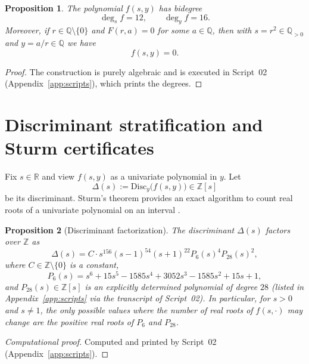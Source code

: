 \documentclass[12pt]{article}
\newtheorem{proposition}{Proposition}
\theoremstyle{remark}
\theoremstyle{definition}
\begin{document}
\begin{proposition}\label{prop:f}
The polynomial $f(s,y)$ has bidegree
\[
\deg_s f=12,\qquad \deg_y f=16.
\]
Moreover, if $r\in\mathbb{Q}\setminus\{0\}$ and $F(r,a)=0$ for some $a\in\mathbb{Q}$, then with $s=r^2\in\mathbb{Q}_{>0}$ and $y=a/r\in\mathbb{Q}$ we have
\[
f(s,y)=0.
\]
\end{proposition}

\begin{proof}
The construction is purely algebraic and is executed in Script~02 (Appendix~\ref{app:scripts}), which prints the degrees.
\end{proof}


\section{Discriminant stratification and Sturm certificates}\label{sec:sturm}

Fix $s\in\mathbb{R}$ and view $f(s,y)$ as a univariate polynomial in $y$.
Let
\[
\Delta(s):=\mathrm{Disc}_y\bigl(f(s,y)\bigr)\in\mathbb{Z}[s]
\]
be its discriminant.
Sturm's theorem provides an exact algorithm to count real roots of a univariate polynomial on an interval \cite{Sturm}.

\begin{proposition}[Discriminant factorization]\label{prop:disc}
The discriminant $\Delta(s)$ factors over $\mathbb{Z}$ as
\begin{equation}\label{eq:disc}
\Delta(s)=C\cdot s^{156}(s-1)^{54}(s+1)^{22}P_6(s)^{4}P_{28}(s)^{2},
\end{equation}
where $C\in\mathbb{Z}\setminus\{0\}$ is a constant,
\begin{equation}\label{eq:P6}
P_6(s)=s^{6}+15s^{5}-1585s^{4}+3052s^{3}-1585s^{2}+15s+1,
\end{equation}
and $P_{28}(s)\in\mathbb{Z}[s]$ is an explicitly determined polynomial of degree $28$ (listed in Appendix~\ref{app:scripts} via the transcript of Script~02).
In particular, for $s>0$ and $s\neq 1$, the only possible values where the number of real roots of $f(s,\cdot)$ may change are the positive real roots of $P_6$ and $P_{28}$.
\end{proposition}

\begin{proof}[Computational proof]
Computed and printed by Script~02 (Appendix~\ref{app:scripts}).
\end{proof}
\end{document}

